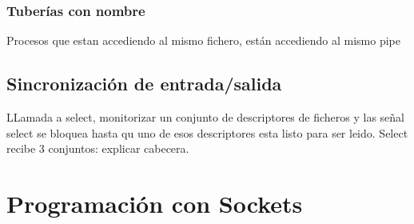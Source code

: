 \subsubsection{Tuberías con nombre}
Procesos que estan accediendo al mismo fichero, están accediendo al mismo pipe
\subsection{Sincronización de entrada/salida}
LLamada a select, monitorizar un conjunto de descriptores de ficheros y las señal select se bloquea hasta qu uno de esos descriptores esta listo para ser leido.
Select recibe 3 conjuntos: explicar cabecera.

\section{Programación con Sockets}
















